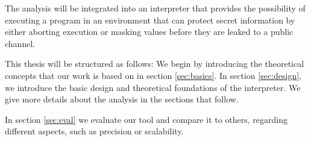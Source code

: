 The analysis will be integrated into an interpreter that provides the possibility of executing a program in an environment that can protect secret information by either aborting execution or masking values before they are leaked to a public channel.

This thesis will be structured as follows: We begin by introducing the theoretical concepts that our work is based on in section \ref{sec:basics}. In section \ref{sec:design}, we introduce the basic design and theoretical foundations of the interpreter. We give more details about the analysis in the sections that follow.

In section \ref{sec:eval} we evaluate our tool and compare it to others, regarding different aspects, such as precision or scalability.
